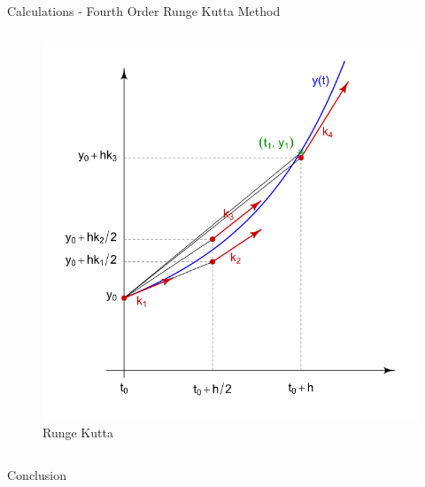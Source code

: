 \documentclass{beamer}  %
\begin{document}
\begin{frame}{Calculations - Fourth Order Runge Kutta Method}
\begin{columns}
\begin{column}{0.50\textwidth}
\begin{figure}
\label{fig:3}
\caption{Runge Kutta}
\includegraphics[scale=0.35]{runge-kutta}
\end{figure}
 \end{column}
\end{columns}

\end{frame}

\begin{frame}{Conclusion}

\end{frame}
\end{document}
